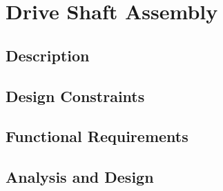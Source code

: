 \section{Drive Shaft Assembly}
\subsection{Description}
\subsection{Design Constraints}
\subsection{Functional Requirements}
\subsection{Analysis and Design}